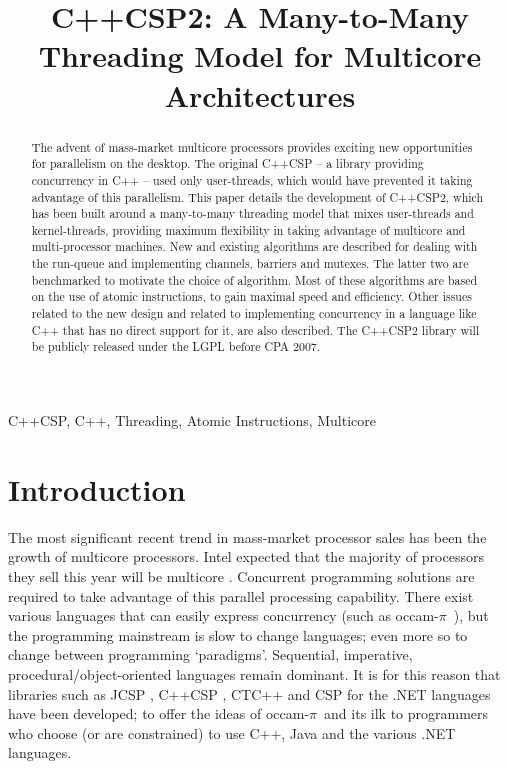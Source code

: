 \documentclass[12pt]{IOS-Book-Article-CPA-2007}
\newcommand{\occampi}{occam-$\pi$}
\begin{document}
\begin{frontmatter}

\title{C++CSP2: A Many-to-Many Threading Model for Multicore Architectures}
\author{ }

\address{Computing Laboratory, University of Kent, Canterbury, Kent, CT2 7NF, UK. {\tt neil@twistedsquare.com/nccb2@kent.ac.uk}}


\begin{abstract}

The advent of mass-market multicore processors provides exciting new opportunities for parallelism on the desktop.  
The original C++CSP -- a library providing concurrency in C++ -- used only user-threads, which would have prevented it taking advantage of
this parallelism.  This paper details the development of C++CSP2, which has been built around a many-to-many threading model that mixes 
user-threads and kernel-threads, providing maximum flexibility in taking advantage of multicore and multi-processor machines.  
New and existing algorithms are described for dealing with the run-queue and implementing channels, barriers and mutexes.  The latter
two are benchmarked to motivate the choice of algorithm.
Most of these algorithms are based on the use of atomic instructions, to gain maximal speed and efficiency.
Other issues related to the new design and related to implementing concurrency in a language like C++ that has no direct support for it, are also described.  
The C++CSP2 library will be publicly released under the LGPL before CPA 2007.

\end{abstract}

\begin{keyword}
C++CSP, C++, Threading, Atomic Instructions, Multicore
\end{keyword}

\end{frontmatter}


\section*{Introduction}

The most significant recent trend in mass-market processor sales has been the growth of multicore processors.  Intel expected that the majority
of processors they sell this year will be multicore \cite{multicore-sales}.  Concurrent programming solutions are required to take advantage of this parallel processing capability.
There exist various languages that can easily express concurrency (such as \occampi~\cite{web-occampi}), but the programming mainstream is slow to change languages; even 
more so to change between programming `paradigms'.  Sequential, imperative, procedural/object-oriented languages remain dominant.  
It is for this reason that libraries such as JCSP \cite{welch-jcsp-97}, C++CSP \cite{brown-c++csp-03,brown-c++cspnet-04}, CTC++ \cite{orlic-ctc++-04} and CSP for the .NET languages 
\cite{lehmberg-csp.net-06,chalmers-csp.net-06} have been 
developed; to offer the ideas of \occampi~and its ilk to programmers who choose (or are constrained) to use C++, Java and the various .NET languages.
\end{document}
